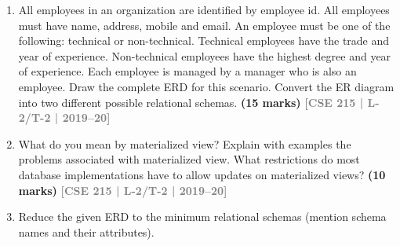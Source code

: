 \documentclass[12pt]{article}
\newcommand{\yr}[1]{\hfill\textcolor{gray}{\small\textbf{[#1]}}}
\newcommand{\mk}[1]{\textcolor{orange!70!black}{\small\textbf{(#1 marks)}}}
\begin{document}
\begin{enumerate}
\item All employees in an organization are identified by employee id. All employees must have name, address, mobile and email. An employee must be one of the following: technical or non-technical. Technical employees have the trade and year of experience. Non-technical employees have the highest degree and year of experience. Each employee is managed by a manager who is also an employee. Draw the complete ERD for this scenario. Convert the ER diagram into two different possible relational schemas.
\mk{15} \yr{CSE 215 | L-2/T-2 | 2019--20}


\item What do you mean by materialized view? Explain with examples the problems associated with materialized view. What restrictions do most database implementations have to allow updates on materialized views?
\mk{10} \yr{CSE 215 | L-2/T-2 | 2019--20}


\item Reduce the given ERD to the minimum relational schemas (mention schema names and their attributes).

\begin{center}
\end{center}
\end{enumerate}
\end{document}
